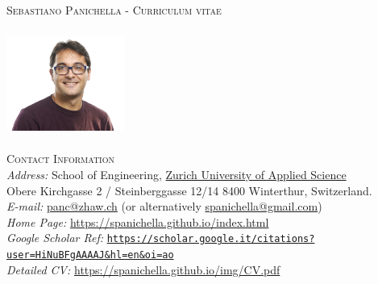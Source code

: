 \documentclass[12pt]{article}
\providecommand*\url[1]{\href{#1}{#1}}
\renewcommand*\url[1]{\href{#1}{\texttt{#1}}}
\providecommand*\email[1]{\href{mailto:#1}{#1}}
\begin{document}
\vspace{-2mm}
\textsc{Sebastiano Panichella - Curriculum vitae}\\
\vspace{-2mm}


\noindent\begin{minipage}{0.3\textwidth}%
\includegraphics[width=3.9cm, height=3.5cm]{images/s_panichella.jpg}
\end{minipage}%
\hfill%
\begin{minipage}{0.9\textwidth}\raggedright
\textsc{Contact Information}\\
{\small
\textit{Address:} School of Engineering,  \href{https://www.zhaw.ch/en/about-us/person/panc/}{Zurich University of Applied Science}\\
Obere Kirchgasse 2 / Steinberggasse 12/14
8400 Winterthur, Switzerland.\\
\textit{E-mail:} \email{panc@zhaw.ch} (or alternatively \email{spanichella@gmail.com})\\
\textit{Home Page:} \href{https://spanichella.github.io/index.html}{https://spanichella.github.io/index.html}\\
\textit{Google Scholar Ref:}  \url{https://scholar.google.it/citations?user=HiNuBFgAAAAJ\&hl=en\&oi=ao}\\
\textit{Detailed CV:} \href{https://spanichella.github.io/img/CV.pdf}{https://spanichella.github.io/img/CV.pdf}}\\
\end{minipage}
\end{document}
